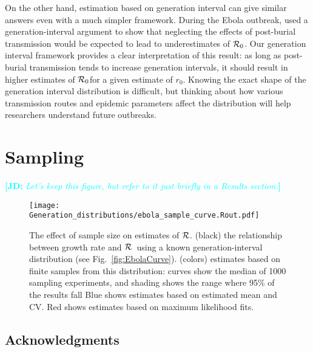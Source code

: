 \documentclass[12pt,]{article}
\newcommand{\RR}{\ensuremath{{\cal R}}}
\newcommand{\Rx}[1]{\ensuremath{{\cal R}_{#1}}}
\newcommand{\Ro}{\Rx{0}}
\newcommand{\fref}[1]{Fig.~\ref{fig:#1}}
\newcommand{\comment}[3]{\textcolor{#1}{\textbf{[#2: }\textit{#3}\textbf{]}}}
\newcommand{\jd}[1]{\comment{cyan}{JD}{#1}}
\begin{document}
On the other hand, estimation based on generation interval can give similar answers even with a much simpler framework.
During the Ebola outbreak, \cite{WeitDush15} used a generation-interval argument to  show that neglecting the effects of post-burial transmission would be expected to lead to underestimates of \Ro.
Our generation interval framework provides a clear interpretation of this result: as long as post-burial transmission tends to increase generation intervals, it should result in higher estimates of \Ro for a given estimate of $r_0$.
Knowing the exact shape of the generation interval distribution is difficult, but thinking about how various transmission routes and epidemic parameters affect the distribution will help researchers understand future outbreaks.

\section{Sampling}

\jd{Let's keep this figure, but refer to it just briefly in a Results section.}

\begin{figure}[htbp] \centering
	\texttt{[image: Generation\_distributions/ebola\_sample\_curve.Rout.pdf]}
\caption{
%
The effect of sample size on estimates of \RR.
(black) the relationship between growth rate and \RR~using a known generation-interval distribution (see \fref{EbolaCurve}).
(colors) estimates based on finite samples from this distribution: curves show the median of 1000 sampling experiments, and shading shows the range where 95\% of the results fall
Blue shows estimates based on estimated mean and CV.
Red shows estimates based on maximum likelihood fits.
%
}
	\label{fig:ebolaSample}
\end{figure}

\subsection*{Acknowledgments}

\printbibliography
\end{document}
